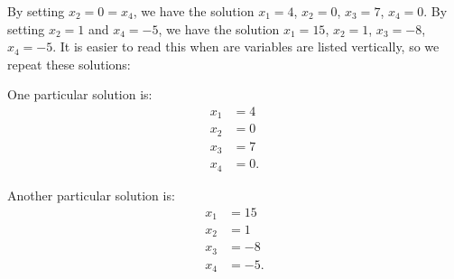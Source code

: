{%

By setting $x_2 = 0 = x_4$, we have the solution $x_1 = 4$, $x_2 = 0$, $x_3 = 7$, $x_4 = 0$. By setting $x_2 = 1$ and $x_4 = -5$, we have the solution $x_1 = 15$, $x_2 = 1$, $x_3 = -8$, $x_4 = -5$. It is easier to read this when are variables are listed vertically, so we repeat these solutions:

\begin{center}
\begin{minipage}{.4\linewidth}
One particular solution is:
\begin{align*} 
 x_1 &= 4\\ 
 x_2 &=0 \\ 
 x_3 &= 7 \\ 
 x_4 &= 0. 
\end{align*}
\end{minipage}
\begin{minipage}{.4\linewidth}
Another particular solution is:
\begin{align*}
 x_1 &= 15\\ 
 x_2 &=1 \\ 
 x_3 &= -8 \\ 
 x_4 &= -5. 
\end{align*}
\end{minipage}
\end{center}
}

\medskip

